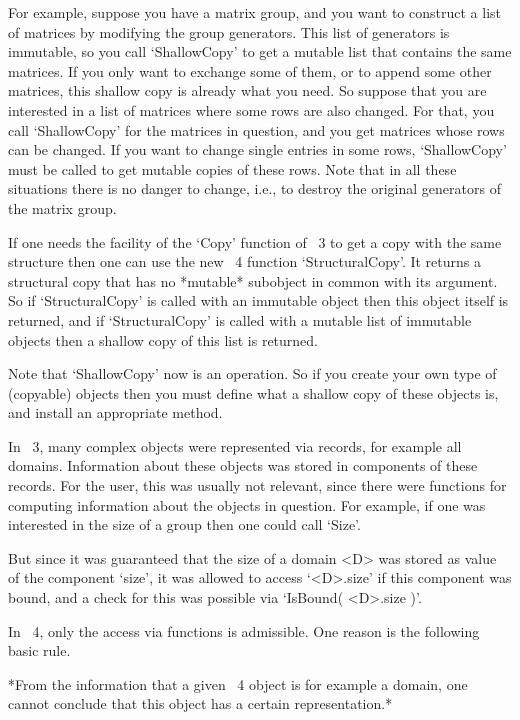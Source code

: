 For example, suppose you have a matrix group, and you want to
construct a list of matrices by modifying the group generators.  This
list of generators is immutable, so you call `ShallowCopy' to get a
mutable list that contains the same matrices.  If you only want to
exchange some of them, or to append some other matrices, this shallow
copy is already what you need.  So suppose that you are interested in
a list of matrices where some rows are also changed.  For that, you
call `ShallowCopy' for the matrices in question, and you get matrices
whose rows can be changed.  If you want to change single entries in
some rows, `ShallowCopy' must be called to get mutable copies of these
rows.  Note that in all these situations there is no danger to change,
i.e., to destroy the original generators of the matrix group.

If one needs the facility of the `Copy' function of {\GAP}~3 to get a
copy with the same structure then one can use the new {\GAP}~4
function `StructuralCopy'.  It returns a structural copy that has no
*mutable* subobject in common with its argument.  So if
`StructuralCopy' is called with an immutable object then this object
itself is returned, and if `StructuralCopy' is called with a mutable
list of immutable objects then a shallow copy of this list is
returned.

Note that `ShallowCopy' now is an operation.  So if you create your
own type of (copyable) objects then you must define what a shallow
copy of these objects is, and install an appropriate method.



In {\GAP}~3, many complex objects were represented via records, for
example all domains.  Information about these objects was stored in
components of these records.  For the user, this was usually not
relevant, since there were functions for computing information about
the objects in question.  For example, if one was interested in the
size of a group then one could call `Size'.

But since it was guaranteed that the size of a domain <D> was stored
as value of the component `size', it was allowed to access `<D>.size'
if this component was bound, and a check for this was possible via
`IsBound( <D>.size )'.

In {\GAP}~4, only the access via functions is admissible.  One reason
is the following basic rule.

*From the information that a given {\GAP}~4 object is for example a
domain, one cannot conclude that this object has a certain
representation.*


